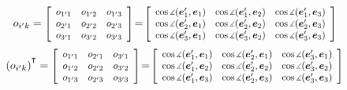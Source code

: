 \documentclass[11pt,twoside]{book}
\newcommand\T{{\mathpalette\raiseT\intercal}} %
\newcommand\raiseT[2]{\hspace{-0.02em}\raisebox{0.4ex}{$#1#2$}}
\newcommand\cosinematrix[1]{o_{#1}} %
\begin{document}
\newpage

\[
\cosinematrix{i'k} = \scalebox{0.88}[0.88]{$\left[
\begin{array}{ccc}
\cosinematrix{1'1} & \cosinematrix{1'2} & \cosinematrix{1'3} \\
\cosinematrix{2'1} & \cosinematrix{2'2} & \cosinematrix{2'3} \\
\cosinematrix{3'1} & \cosinematrix{3'2} & \cosinematrix{3'3}
\end{array}
\right]$} \!=\! \scalebox{0.86}[0.88]{$\left[
\begin{array}{ccc}
\operatorname{cos} \scalebox{0.8}[0.8]{$\measuredangle$} (\bm{e}'_1, \bm{e}_1) & \operatorname{cos} \scalebox{0.8}[0.8]{$\measuredangle$} (\bm{e}'_1, \bm{e}_2) & \operatorname{cos} \scalebox{0.8}[0.8]{$\measuredangle$} (\bm{e}'_1, \bm{e}_3) \\
\operatorname{cos} \scalebox{0.8}[0.8]{$\measuredangle$} (\bm{e}'_2, \bm{e}_1) & \operatorname{cos} \scalebox{0.8}[0.8]{$\measuredangle$} (\bm{e}'_2, \bm{e}_2) & \operatorname{cos} \scalebox{0.8}[0.8]{$\measuredangle$} (\bm{e}'_2, \bm{e}_3) \\
\operatorname{cos} \scalebox{0.8}[0.8]{$\measuredangle$} (\bm{e}'_3, \bm{e}_1) & \operatorname{cos} \scalebox{0.8}[0.8]{$\measuredangle$} (\bm{e}'_3, \bm{e}_2) & \operatorname{cos} \scalebox{0.8}[0.8]{$\measuredangle$} (\bm{e}'_3, \bm{e}_3)
\end{array}
\right]$}
\]\vspace{0.5ex}
\[
\left(\cosinematrix{i'k}\right)^{\T} = \scalebox{0.88}[0.88]{$\left[
\begin{array}{ccc}
\cosinematrix{1'1} & \cosinematrix{2'1} & \cosinematrix{3'1} \\
\cosinematrix{1'2} & \cosinematrix{2'2} & \cosinematrix{3'2} \\
\cosinematrix{1'3} & \cosinematrix{2'3} & \cosinematrix{3'3}
\end{array}
\right]$} \!=\! \scalebox{0.86}[0.88]{$\left[
\begin{array}{ccc}
\operatorname{cos} \scalebox{0.8}[0.8]{$\measuredangle$} (\bm{e}'_1, \bm{e}_1) & \operatorname{cos} \scalebox{0.8}[0.8]{$\measuredangle$} (\bm{e}'_2, \bm{e}_1) & \operatorname{cos} \scalebox{0.8}[0.8]{$\measuredangle$} (\bm{e}'_3, \bm{e}_1) \\
\operatorname{cos} \scalebox{0.8}[0.8]{$\measuredangle$} (\bm{e}'_1, \bm{e}_2) & \operatorname{cos} \scalebox{0.8}[0.8]{$\measuredangle$} (\bm{e}'_2, \bm{e}_2) & \operatorname{cos} \scalebox{0.8}[0.8]{$\measuredangle$} (\bm{e}'_3, \bm{e}_2) \\
\operatorname{cos} \scalebox{0.8}[0.8]{$\measuredangle$} (\bm{e}'_1, \bm{e}_3) & \operatorname{cos} \scalebox{0.8}[0.8]{$\measuredangle$} (\bm{e}'_2, \bm{e}_3) & \operatorname{cos} \scalebox{0.8}[0.8]{$\measuredangle$} (\bm{e}'_3, \bm{e}_3)
\end{array}
\right]$}
\]
\end{document}
